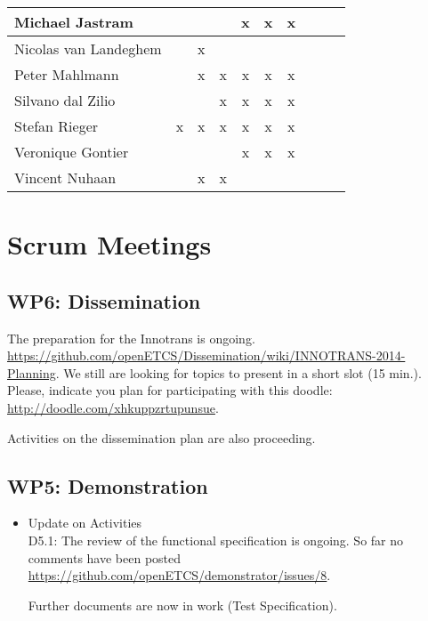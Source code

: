 \documentclass[a4paper, 11pt]{article}
\begin{document}
\begin{tabular}{|l|c|c|c||c|c|c||c|c|c|}
Michael Jastram      &   &   &   & x & x & x \\\hline
Nicolas van Landeghem&   & x &   &   &   &   \\\hline
Peter Mahlmann       &   & x & x & x & x & x \\\hline
Silvano dal Zilio    &   &   & x & x & x & x \\\hline
Stefan Rieger        & x & x & x & x & x & x \\\hline
Veronique Gontier    &   &   &   & x & x & x \\\hline
Vincent Nuhaan       &   & x & x &   &   &   \\\hline
\end{tabular}


\section{Scrum Meetings}

\subsection{WP6: Dissemination}

The preparation for the Innotrans is ongoing. \url{
https://github.com/openETCS/Dissemination/wiki/INNOTRANS-2014-Planning}. We still are looking for topics to present in a short slot (15 min.). Please, indicate you plan for participating with this doodle: \url{http://doodle.com/xhkuppzrtupunsue}.

Activities on the dissemination plan are also proceeding.

\subsection{WP5: Demonstration}
\begin{itemize}
\item Update on Activities\\

D5.1: The review of the functional specification is ongoing. So far no comments have been posted \url{https://github.com/openETCS/demonstrator/issues/8}.

Further documents are now in work (Test Specification).

\end{itemize}
\end{document}
